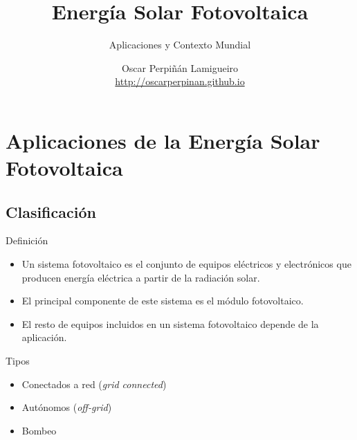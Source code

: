 \documentclass[xcolor={usenames,svgnames,dvipsnames}]{beamer}
\author{Oscar Perpiñán Lamigueiro \\ \url{http://oscarperpinan.github.io}}
\date{}
\title{Energía Solar Fotovoltaica}
\subtitle{Aplicaciones y Contexto Mundial}
\begin{document}
\maketitle

\section{Aplicaciones de la Energía Solar Fotovoltaica}
\label{sec:org78da776}

\subsection{Clasificación}
\label{sec:org159bc1b}

\begin{frame}[label={sec:orgac2f2cb}]{Definición}
\begin{itemize}
\item Un sistema fotovoltaico es el conjunto de equipos eléctricos y
electrónicos que producen energía eléctrica a partir de la radiación
solar.

\item El principal componente de este sistema es el módulo fotovoltaico.

\item El resto de equipos incluidos en un sistema fotovoltaico depende de la aplicación.
\end{itemize}

\begin{block}{Tipos}
\begin{itemize}
\item Conectados a red (\emph{grid connected})

\item Autónomos (\emph{off-grid})

\item Bombeo
\end{itemize}
\end{block}
\end{frame}
\end{document}
